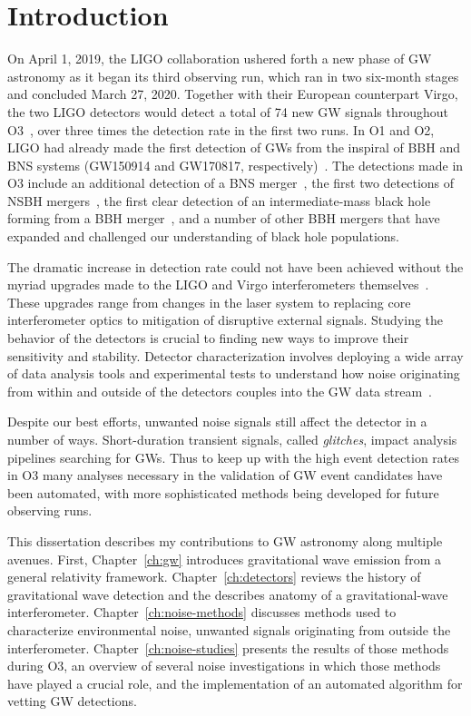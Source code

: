 \chapter{Introduction}

On April 1, 2019, the \ac{LIGO} collaboration ushered forth a new phase of \ac{GW} astronomy as it began its third observing run, which ran in two six-month stages and concluded March 27, 2020.
Together with their European counterpart Virgo, the two \ac{LIGO} detectors would detect a total of 74 new \ac{GW} signals throughout \ac{O3}~\citep{gwtc2, gwtc3}, over three times the detection rate in the first two runs.
In \ac{O1} and \ac{O2}, \ac{LIGO} had already made the first detection of \acp{GW} from the inspiral of \ac{BBH} and \ac{BNS} systems (GW150914 and GW170817, respectively)~\citep{gw150914, gw170817}.
The detections made in \ac{O3} include an additional detection of a \ac{BNS} merger~\citep{gw190425}, the first two detections of \ac{NSBH} mergers~\citep{nsbh_o3}, the first clear detection of an intermediate-mass black hole forming from a \ac{BBH} merger~\citep{gw190521}, and a number of other \ac{BBH} mergers that have expanded and challenged our understanding of black hole populations.

The dramatic increase in detection rate could not have been achieved without the myriad upgrades made to the LIGO and Virgo interferometers themselves~\citep{Buikema_2020}.
These upgrades range from changes in the laser system to replacing core interferometer optics to mitigation of disruptive external signals.
Studying the behavior of the detectors is crucial to finding new ways to improve their sensitivity and stability.
Detector characterization involves deploying a wide array of data analysis tools and experimental tests to understand how noise originating from within and outside of the detectors couples into the \ac{GW} data stream~\citep{Davis_2019, Davis_2021}.

Despite our best efforts, unwanted noise signals still affect the detector in a number of ways.
Short-duration transient signals, called \textit{glitches}, impact analysis pipelines searching for \acp{GW}.
Thus to keep up with the high event detection rates in \ac{O3} many analyses necessary in the validation of \ac{GW} event candidates have been automated, with more sophisticated methods being developed for future observing runs.

This dissertation describes my contributions to \ac{GW} astronomy along multiple avenues. First, Chapter~\ref{ch:gw} introduces gravitational wave emission from a general relativity framework. Chapter~\ref{ch:detectors} reviews the history of gravitational wave detection and the describes anatomy of a gravitational-wave interferometer. Chapter~\ref{ch:noise-methods} discusses methods used to characterize environmental noise, unwanted signals originating from outside the interferometer. Chapter~\ref{ch:noise-studies} presents the results of those methods during O3, an overview of several noise investigations in which those methods have played a crucial role, and the implementation of an automated algorithm for vetting \ac{GW} detections.

